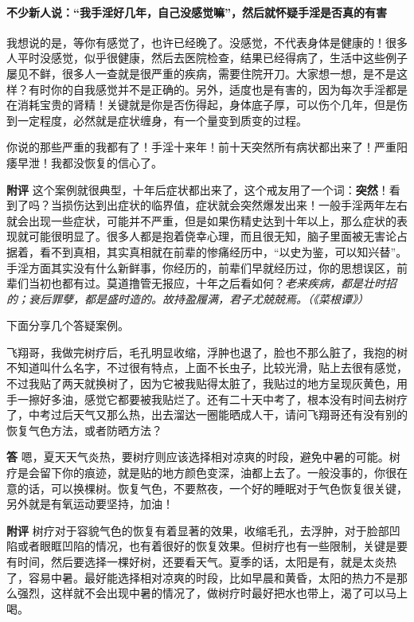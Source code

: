 \paragraph{不少新人说：“我手淫好几年，自己没感觉嘛”，然后就怀疑手淫是否真的有害}

我想说的是，等你有感觉了，也许已经晚了。没感觉，不代表身体是健康的！很多人平时没感觉，似乎很健康，然后去医院检查，结果已经得病了，生活中这些例子屡见不鲜，很多人一查就是很严重的疾病，需要住院开刀。大家想一想，是不是这样？有时你的自我感觉并不是正确的。另外，适度也是有害的，因为每次手淫都是在消耗宝贵的肾精！关键就是你是否伤得起，身体底子厚，可以伤个几年，但是伤到一定程度，必然就是症状缠身，有一个量变到质变的过程。

\begin{case}
    你说的那些严重的我都有了！手淫十来年！前十天突然所有病状都出来了！严重阳痿早泄！我都没恢复的信心了。

    \textbf{附评} 这个案例就很典型，十年后症状都出来了，这个戒友用了一个词：\textbf{突然}！看到了吗？当损伤达到出症状的临界值，症状就会突然爆发出来！一般手淫两年左右就会出现一些症状，可能并不严重，但是如果伤精史达到十年以上，那么症状的表现就可能很明显了。很多人都是抱着侥幸心理，而且很无知，脑子里面被无害论占据着，看不到真相，其实真相就在前辈的惨痛经历中，“以史为鉴，可以知兴替”。手淫方面其实没有什么新鲜事，你经历的，前辈们早就经历过，你的思想误区，前辈们当初也都有过。莫道撸管无报应，十年之后看如何？\textit{老来疾病，都是壮时招的；衰后罪孽，都是盛时造的。故持盈履满，君子尤兢兢焉。（《菜根谭》）}
\end{case}

下面分享几个答疑案例。

\begin{case}
    飞翔哥，我做完树疗后，毛孔明显收缩，浮肿也退了，脸也不那么脏了，我抱的树不知道叫什么名字，不过很有特点，上面不长虫子，比较光滑，贴上去很有感觉，不过我贴了两天就换树了，因为它被我贴得太脏了，我贴过的地方呈现灰黄色，用手一擦好多油，感觉它都要被我贴烂了。还有二十天中考了，根本没有时间去树疗了，中考过后天气又那么热，出去溜达一圈能晒成人干，请问飞翔哥还有没有别的恢复气色方法，或者防晒方法？

    \textbf{答} 嗯，夏天天气炎热，要树疗则应该选择相对凉爽的时段，避免中暑的可能。树疗是会留下你的痕迹，就是贴的地方颜色变深，油都上去了。一般没事的，你很在意的话，可以换棵树。恢复气色，不要熬夜，一个好的睡眠对于气色恢复很关键，另外就是有氧运动要坚持，加油！

    \textbf{附评} 树疗对于容貌气色的恢复有着显著的效果，收缩毛孔，去浮肿，对于脸部凹陷或者眼眶凹陷的情况，也有着很好的恢复效果。但树疗也有一些限制，关键是要有时间，然后要选择一棵好树，还要看天气。夏季的话，太阳是有，就是太炎热了，容易中暑。最好能选择相对凉爽的时段，比如早晨和黄昏，太阳的热力不是那么强烈，这样就不会出现中暑的情况了，做树疗时最好把水也带上，渴了可以马上喝。
\end{case}

